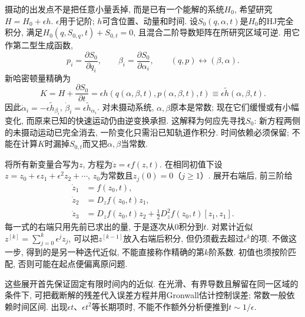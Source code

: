 摄动的出发点不是把任意小量丢掉, 而是已有一个能解的系统$H_0$, 希望研究$H=H_0+\epsilon h$. $\epsilon$用于记阶; $h$可含位置、动量和时间. 设$S_0(q,\alpha,t)$是$H_0$的HJ完全积分, 满足$H_0(q,S_{0,q},t)+S_{0,t}=0$, 且混合二阶导数矩阵在所研究区域可逆. 用它作第二型生成函数,
\[
p_i=\frac{\partial S_0}{\partial q_i},\qquad
\beta_i=\frac{\partial S_0}{\partial\alpha_i},\qquad
(q,p)\longleftrightarrow(\beta,\alpha).
\]
新哈密顿量精确为
\[
K=H+\frac{\partial S_0}{\partial t}
=\epsilon h(q(\alpha,\beta,t),p(\alpha,\beta,t),t)
\equiv\epsilon\widetilde h(\alpha,\beta,t).
\]
因此$\dot\alpha_i=-\epsilon\widetilde h_{\beta_i}$, $\dot\beta_i=\epsilon\widetilde h_{\alpha_i}$. 对未摄动系统, $\alpha,\beta$原本是常数; 现在它们缓慢或有小幅变化, 而原来已知的快速运动仍由逆变换承担. 这解释为何应先寻找$S_0$: 新方程两侧的未摄动运动已完全消去, 一阶变化只需沿已知轨道作积分. 时间依赖必须保留; 不能在计算$K$时漏掉$S_{0,t}$而又把$\alpha,\beta$当常数.

将所有新变量合写为$z$, 方程为$\dot z=\epsilon f(z,t)$. 在相同初值下设$z=z_0+\epsilon z_1+\epsilon^2z_2+\cdots$, $z_0$为常数且$z_j(0)=0$（$j\ge1$）. 展开右端后, 前三阶给
\[
\begin{aligned}
\dot z_1&=f(z_0,t),\\
\dot z_2&=D_zf(z_0,t)z_1,\\
\dot z_3&=D_zf(z_0,t)z_2+
\tfrac12D_z^2f(z_0,t)[z_1,z_1].
\end{aligned}
\]
每一式的右端只用先前已求出的量, 于是逐次从0积分到$t$. 对累计近似$z^{[k]}=\sum_{j=0}^k\epsilon^jz_j$, 可以把$z^{[k-1]}$放入右端后积分, 但仍须截去超过$\epsilon^k$的项. 不做这一步, 得到的是另一种迭代近似, 不能直接称作精确的第$k$阶系数. 初值也须按阶匹配, 否则可能在起点便偏离原问题.

这些展开首先保证固定有限时间内的近似. 在光滑、有界导数且解留在同一区域的条件下, 可把截断解的残差代入误差方程并用Gronwall估计控制误差; 常数一般依赖时间区间. 出现$\epsilon t$、$\epsilon t^2$等长期项时, 不能不作额外分析便推到$t\sim1/\epsilon$.

